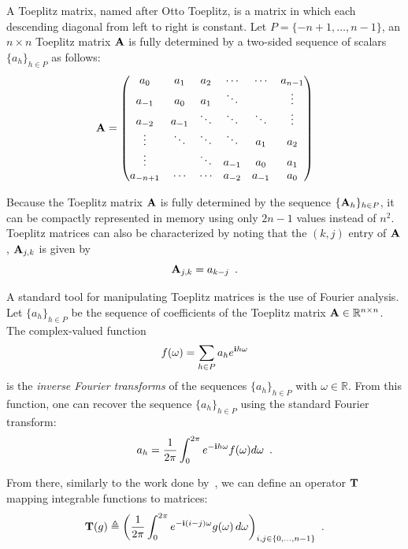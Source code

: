 A Toeplitz matrix, named after Otto Toeplitz, is a matrix in which each descending diagonal from left to right is constant.
Let $P = \{-n+1, \dots, n-1\}$, an $n\times n$ Toeplitz matrix $\mathbf{A}$ is fully determined by a two-sided sequence of scalars $\{a_h\}_{h \in P}$ as follows:
\begin{equation}
  \mathbf{A} =
  \begin{pmatrix}
    a_0 & a_{1} & a_{2} & \cdots & \cdots & a_{n-1} \\
    a_{-1} & a_0 & a_{1} & \ddots & & \vdots \\
    a_{-2} & a_{-1} & \ddots & \ddots & \ddots & \vdots \\ 
    \vdots & \ddots & \ddots & \ddots & a_{1} & a_{2} \\
    \vdots & & \ddots & a_{-1} & a_{0} & a_{1} \\
    a_{-n+1} & \cdots & \cdots & a_{-2} & a_{-1} & a_0
  \end{pmatrix}
\end{equation}

\noindent
Because the Toeplitz matrix $\mathbf{A}$ is fully determined by the sequence $\{\mathbf{A}_h\}_{h \in P}$, it can be compactly represented in memory using only $2n-1$ values instead of $n^2$.
Toeplitz matrices can also be characterized by noting that the $(k,j)$ entry of $\mathbf{A}$, $\mathbf{A}_{j,k}$ is given by
\begin{equation}
  \mathbf{A}_{j,k} = a_{k-j} \enspace.
\end{equation}

\noindent
A standard tool for manipulating Toeplitz matrices is the use of Fourier analysis.
Let $\{a_h\}_{h \in P}$ be the sequence of coefficients of the Toeplitz matrix $\mathbf{A} \in \mathbb{R}^{n\times n}$.
The complex-valued function 
\begin{equation}
  f(\omega) = \sum_{h \in P} a_h e^{\mathbf{i} h \omega}
\end{equation}
is the \emph{inverse Fourier transforms} of the sequences $\{a_h\}_{h \in P}$ with $\omega \in \mathbb{R}$.
From this function, one can recover the sequence $\{a_h\}_{h \in P}$ using the standard Fourier transform:
\begin{equation}
  a_h = \frac{1}{2\pi} \int_0^{2\pi} e^{-\mathbf{i} h \omega} f(\omega) d\omega \enspace. 
\end{equation}

\noindent
From there, similarly to the work done by~\citet{gray2006toeplitz}, we can define an operator $\mathbf{T}$ mapping integrable functions to matrices:
\begin{equation}
  \Tmat(g) \triangleq \leftmat\frac{1}{2\pi}\int_{0}^{2\pi}e^{-\ci(i-j)\omega}g(\omega)\,d\omega\rightmat_{i,j\in\{0,\ldots,n-1\}} \enspace.
  \label{equation:ch2-toeplitz_operator}
\end{equation}

